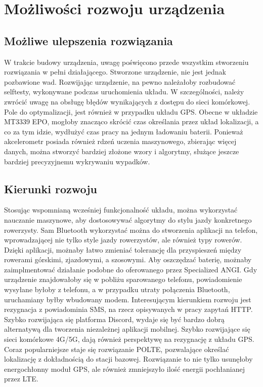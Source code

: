 \chapter{Możliwości rozwoju urządzenia}
\section{Możliwe ulepszenia rozwiązania}
W trakcie budowy urządzenia, uwagę poświęcono przede wszystkim stworzeniu rozwiązania w pełni działającego. Stworzone urządzenie, nie jest jednak pozbawione wad. Rozwijając urządzenie, na pewno należałoby rozbudować selftesty, wykonywane podczas uruchomienia układu. W szczególności, należy zwrócić uwagę na obsługę błędów wynikających z dostępu do sieci komórkowej. Pole do optymalizacji, jest również w przypadku układu GPS. Obecne w układzie MT3339 EPO, mogłoby znacząco skrócić czas określania przez układ lokalizacji, a co za tym idzie, wydłużyć czas pracy na jednym ładowaniu baterii.
\newline
Ponieważ akcelerometr posiada również rdzeń uczenia maszynowego, zbierając więcej danych, można stworzyć bardziej złożone wzory i algorytmy, służące jeszcze bardziej precyzyjnemu wykrywaniu wypadków.
\section{Kierunki rozwoju}
Stosując wspomnianą wcześniej funkcjonalność układu, można wykorzystać nauczanie maszynowe, aby dostosowywać algorytmy do stylu jazdy konkretnego rowerzysty. Sam Bluetooth wykorzystać można do stworzenia aplikacji na telefon, wprowadzającej nie tylko style jazdy rowerzystów, ale również typy rowerów. Dzięki aplikacji, możnaby łatwo zmieniać tolerancję dla przyspieszeń między rowerami górskimi, zjazdowymi, a szosowymi. Aby oszczędzać baterię, możnaby zaimplmentować działanie podobne do oferowanego przez Specialized ANGI. Gdy urządzenie znajdowałoby się w pobliżu sparowanego telefonu, powiadomienie wysyłane byłoby z telefonu, a w przypadku utraty połączenia Bluetooth, uruchamiany byłby wbudowany modem.
\newline
Interesującym kierunkiem rozwoju jest rezygnacja z powiadominia SMS, na rzecz opisywanych w pracy zapytań HTTP. Szybko rozwijająca się platforma Discord, wydaje się być bardzo dobrą alternatywą dla tworzenia niezależnej aplikacji mobilnej.
\newline
Szybko rozwijające się sieci komórkowe 4G/5G, dają również perspektywę na rezygnację z układu GPS. Coraz popularniejsze staje się rozwiązanie POLTE\cite{polte}, pozwalające określać lokalizację z dokładnością do stacji bazowej. Rozwiązanie to nie tylko usunęłoby energochłonny moduł GPS, ale również zmniejszyło ilość energii pochłanianej przez LTE.
 